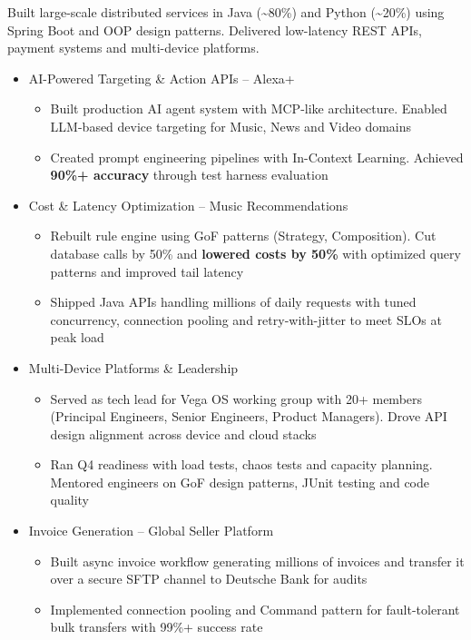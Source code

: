{Built large-scale distributed services in Java (\textasciitilde80\%) and Python (\textasciitilde20\%) using Spring Boot and OOP design patterns. Delivered low-latency REST APIs, payment systems and multi-device platforms.\newline{}
\begin{itemize}
\setlength\itemsep{0.5em}
    \item AI-Powered Targeting \& Action APIs -- Alexa+
        \begin{itemize}
            \item Built production AI agent system with MCP-like architecture. Enabled LLM-based device targeting for Music, News and Video domains
            \item Created prompt engineering pipelines with In-Context Learning. Achieved \textbf{90\%+ accuracy} through test harness evaluation
        \end{itemize}
    \item Cost \& Latency Optimization -- Music Recommendations
        \begin{itemize}
            \item Rebuilt rule engine using GoF patterns (Strategy, Composition). Cut database calls by 50\% and \textbf{lowered costs by 50\%} with optimized query patterns and improved tail latency
            \item Shipped Java APIs handling millions of daily requests with tuned concurrency, connection pooling and retry-with-jitter to meet SLOs at peak load
        \end{itemize}
    \item Multi-Device Platforms \& Leadership
        \begin{itemize}
            \item Served as tech lead for Vega OS working group with 20+ members (Principal Engineers, Senior Engineers, Product Managers). Drove API design alignment across device and cloud stacks
            \item Ran Q4 readiness with load tests, chaos tests and capacity planning. Mentored engineers on GoF design patterns, JUnit testing and code quality
        \end{itemize}
    \item Invoice Generation -- Global Seller Platform
        \begin{itemize}
            \item Built async invoice workflow generating millions of invoices and transfer it over a secure SFTP channel to Deutsche Bank for audits
            \item Implemented connection pooling and Command pattern for fault-tolerant bulk transfers with 99\%+ success rate
        \end{itemize}
\end{itemize}}
